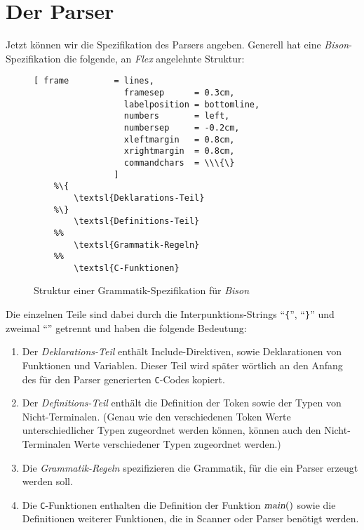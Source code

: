 \section{Der Parser}
Jetzt k\"onnen wir die Spezifikation des Parsers angeben.
Generell hat eine \textsl{Bison}-Spezifikation die folgende, an \textsl{Flex}
angelehnte Struktur: 
\begin{figure}[!ht]
\centering
\begin{Verbatim}[ frame         = lines, 
                  framesep      = 0.3cm, 
                  labelposition = bottomline,
                  numbers       = left,
                  numbersep     = -0.2cm,
                  xleftmargin   = 0.8cm,
                  xrightmargin  = 0.8cm,
                  commandchars  = \\\{\}
                ]
    %\{
        \textsl{Deklarations-Teil}
    %\}
        \textsl{Definitions-Teil} 
    %%
        \textsl{Grammatik-Regeln}
    %%
        \textsl{C-Funktionen}
\end{Verbatim}
\vspace*{-0.3cm}
\caption{Struktur einer Grammatik-Spezifikation f\"ur \textsl{Bison}}
\label{fig:bison}
\end{figure}
Die einzelnen Teile sind dabei durch die Interpunktions-Strings
``\texttt{\{}'',
``\texttt{\}}'' und zweimal 
``\texttt{}''
getrennt und haben die folgende Bedeutung:
\begin{enumerate}
\item Der \emph{Deklarations-Teil} enth\"alt Include-Direktiven, sowie
      Deklarationen von Funktionen und Variablen.  Dieser Teil wird sp\"ater w\"ortlich
      an den Anfang des f\"ur den Parser generierten \texttt{C}-Codes kopiert.
\item Der \emph{Definitions-Teil} enth\"alt die Definition der Token sowie der Typen 
      von Nicht-Terminalen.  (Genau wie den verschiedenen Token Werte
      unterschiedlicher Typen zugeordnet werden k\"onnen, k\"onnen auch den
      Nicht-Terminalen Werte verschiedener Typen zugeordnet werden.)
\item Die \emph{Grammatik-Regeln} spezifizieren die Grammatik, f\"ur die ein Parser
      erzeugt werden soll.
\item Die \texttt{C}-Funktionen enthalten die Definition der Funktion $\textsl{main}()$ 
      sowie die Definitionen weiterer Funktionen, die in Scanner oder Parser ben\"otigt
      werden.
\end{enumerate}


